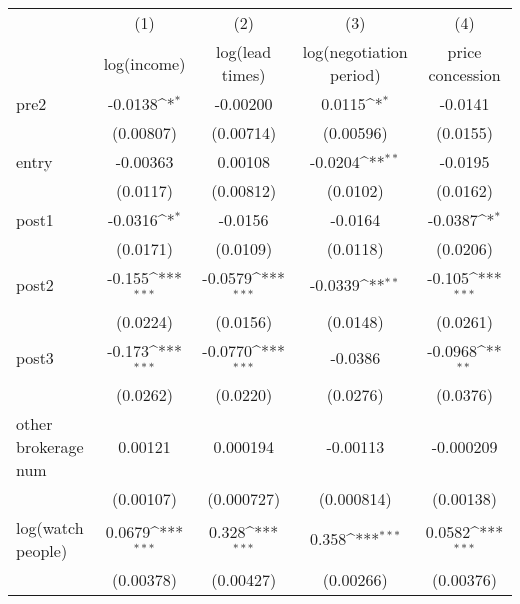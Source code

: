 {
\def\sym#1{\ifmmode^{#1}\else\(^{#1}\)\fi}
\begin{adjustbox}{max width=\textwidth}
\begin{tabular}{l*{4}{c}}
\toprule
            &\multicolumn{1}{c}{(1)}&\multicolumn{1}{c}{(2)}&\multicolumn{1}{c}{(3)}&\multicolumn{1}{c}{(4)}\\
            &\multicolumn{1}{c}{log(income)}&\multicolumn{1}{c}{log(lead times)}&\multicolumn{1}{c}{log(negotiation period)}&\multicolumn{1}{c}{price concession}\\
\midrule
pre2        &     -0.0138\sym{*}  &    -0.00200         &      0.0115\sym{*}  &     -0.0141         \\
            &   (0.00807)         &   (0.00714)         &   (0.00596)         &    (0.0155)         \\
\addlinespace
entry       &    -0.00363         &     0.00108         &     -0.0204\sym{**} &     -0.0195         \\
            &    (0.0117)         &   (0.00812)         &    (0.0102)         &    (0.0162)         \\
\addlinespace
post1       &     -0.0316\sym{*}  &     -0.0156         &     -0.0164         &     -0.0387\sym{*}  \\
            &    (0.0171)         &    (0.0109)         &    (0.0118)         &    (0.0206)         \\
\addlinespace
post2       &      -0.155\sym{***}&     -0.0579\sym{***}&     -0.0339\sym{**} &      -0.105\sym{***}\\
            &    (0.0224)         &    (0.0156)         &    (0.0148)         &    (0.0261)         \\
\addlinespace
post3       &      -0.173\sym{***}&     -0.0770\sym{***}&     -0.0386         &     -0.0968\sym{**} \\
            &    (0.0262)         &    (0.0220)         &    (0.0276)         &    (0.0376)         \\
\addlinespace
other brokerage num  &     0.00121         &    0.000194         &    -0.00113         &   -0.000209         \\
            &   (0.00107)         &  (0.000727)         &  (0.000814)         &   (0.00138)         \\
\addlinespace
log(watch people)&      0.0679\sym{***}&       0.328\sym{***}&       0.358\sym{***}&      0.0582\sym{***}\\
            &   (0.00378)         &   (0.00427)         &   (0.00266)         &   (0.00376)         \\

\end{tabular}
\end{adjustbox}}

